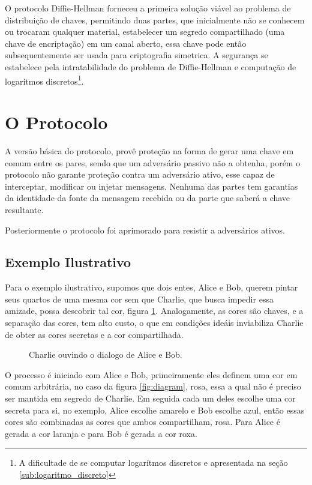 \documentclass{article}
\begin{document}
O protocolo Diffie-Hellman forneceu a primeira solução viável ao problema
de distribuição de chaves, permitindo duas partes, que inicialmente não se
conhecem ou trocaram qualquer material, estabelecer um segredo compartilhado
(uma chave de encriptação) em um canal aberto, essa chave pode então
subsequentemente ser usada para criptografia simetrica. A segurança se
estabelece pela intratabilidade do problema de
Diffie-Hellman\cite{katz1996handbook} e computação de logarítmos
discretos\footnote{A dificultade de se computar logarítmos discretos e
apresentada na seção \ref{sub:logaritmo_discreto}}.

\section{O Protocolo}%
\label{sec:o_protocolo}



A versão básica do protocolo, provê proteção na forma de gerar uma
chave em comum entre os pares, sendo que um adversário passivo não a obtenha,
porém o protocolo não garante proteção contra um adversário ativo, esse capaz
de interceptar, modificar ou injetar mensagens. Nenhuma das partes tem
garantias da identidade da fonte da mensagem recebida ou da parte que saberá
a chave resultante\cite{katz1996handbook}.

Posteriormente o protocolo foi aprimorado para resistir a adversários ativos.

\subsection{Exemplo Ilustrativo}%
\label{sub:exemplo_ilustrativo}
Para o exemplo ilustrativo, supomos que dois entes, Alice e Bob, querem pintar
seus quartos de uma mesma cor sem que Charlie, que busca impedir essa amizade,
possa descobrir tal cor, figura \ref{fig:abc}. Analogamente, as cores são
chaves, e a separação das cores, tem alto custo, o que em condições ideáis
inviabiliza Charlie de obter as cores secretas e a cor compartilhada.

\begin{figure}[htpb]
    \centering
    
    \caption{Charlie ouvindo o dialogo de Alice e Bob.}%
    \label{fig:abc}
\end{figure}

O processo é iniciado com Alice e Bob, primeiramente eles definem
uma cor em comum arbitrária, no caso da figura \ref{fig:diagram}, rosa, essa
a qual não é preciso ser mantida em segredo de Charlie. Em seguida cada um deles
escolhe uma cor secreta para si, no exemplo, Alice escolhe amarelo e Bob
escolhe azul, então essas cores são combinadas as cores que ambos compartilham,
rosa. Para Alice é gerada a cor laranja e para Bob é gerada a cor roxa.
\end{document}
